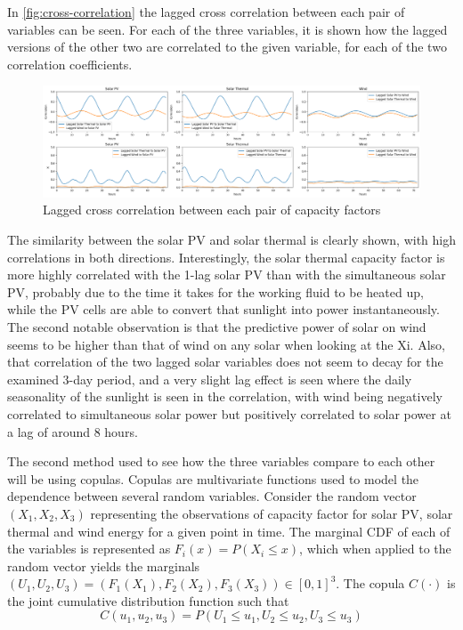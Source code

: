 In \autoref{fig:cross-correlation} the lagged cross correlation between each pair of variables can be seen. For each of the three variables, it is shown how the lagged versions of the other two are correlated to the given variable, for each of the two correlation coefficients. 

\begin{figure}[ht]
    \centering
    \captionsetup{justification=centering}
    \includegraphics[width=\linewidth]{assets/cross-correlation.png}
    \caption{Lagged cross correlation between each pair of capacity factors}
    \label{fig:cross-correlation}
\end{figure}

The similarity between the solar PV and solar thermal is clearly shown, with high correlations in both directions. Interestingly, the solar thermal capacity factor is more highly correlated with the 1-lag solar PV than with the simultaneous solar PV, probably due to the time it takes for the working fluid to be heated up, while the PV cells are able to convert that sunlight into power instantaneously. The second notable observation is that the predictive power of solar on wind seems to be higher than that of wind on any solar when looking at the Xi. Also, that correlation of the two lagged solar variables does not seem to decay for the examined 3-day period, and a very slight lag effect is seen where the daily seasonality of the sunlight is seen in the correlation, with wind being negatively correlated to simultaneous solar power but positively correlated to solar power at a lag of around 8 hours. 


The second method used to see how the three variables compare to each other will be using copulas. Copulas are multivariate functions used to model the dependence between several random variables. Consider the random vector $(X_1,X_2,X_3)$ representing the observations of capacity factor for solar PV, solar thermal and wind energy for a given point in time. The marginal CDF of each of the variables is represented as $F_i\left(x\right)=P\left(X_i\leq x\right)$, which when applied to the random vector yields the marginals $\left(U_1,U_2,U_3\right)=\left(F_1\left(X_1\right),F_2\left(X_2\right),F_3\left(X_3\right)\right)\in \left[0,1\right]^3$. The copula $C(\cdot)$ is the joint cumulative distribution function such that 
\begin{equation}
    C\left(u_1,u_2,u_3\right)=P\left(U_1\leq u_1,U_2\leq u_2,U_3\leq u_3\right)
\end{equation}

